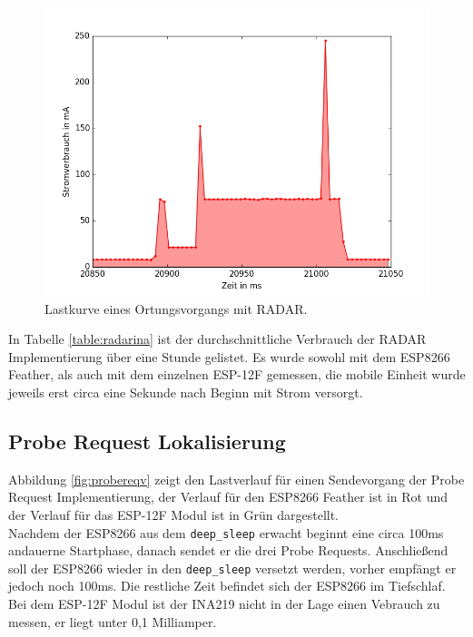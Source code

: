 \begin{figure}[h!]
  \centering
	\includegraphics[width=\textwidth]{plots/radar5ssend.png}
  \caption{Lastkurve eines Ortungsvorgangs mit RADAR.}
  \label{fig:radar5ssend}
\end{figure}

In Tabelle \ref{table:radarina} ist der durchschnittliche Verbrauch der RADAR Implementierung über eine Stunde gelistet.
Es wurde sowohl mit dem ESP8266 Feather, als auch mit dem einzelnen ESP-12F gemessen, die mobile Einheit wurde jeweils erst circa eine Sekunde nach Beginn mit Strom versorgt.

\subsection{Probe Request Lokalisierung}
Abbildung \ref{fig:probereqv} zeigt den Lastverlauf für einen Sendevorgang der Probe Request Implementierung, der Verlauf für den ESP8266 Feather ist in Rot und der Verlauf für das ESP-12F Modul ist in Grün dargestellt.\\
Nachdem der ESP8266 aus dem \texttt{deep\_sleep} erwacht beginnt eine circa 100ms andauerne Startphase, danach sendet er die drei Probe Requests.
Anschließend soll der ESP8266 wieder in den \texttt{deep\_sleep} versetzt werden, vorher empfängt er jedoch noch 100ms.
Die restliche Zeit befindet sich der ESP8266 im Tiefschlaf. 
Bei dem ESP-12F Modul ist der INA219 nicht in der Lage einen Vebrauch zu messen, er liegt unter 0,1 Milliamper.\\

